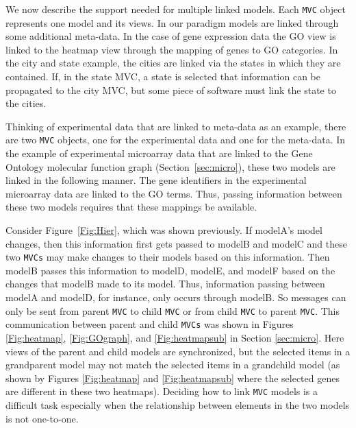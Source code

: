\documentclass[11pt]{article}
\newcommand{\Robject}[1]{{\texttt{#1}}}
\begin{document}

We now describe the support needed for multiple linked models.
Each \Robject{MVC} object represents one model and its views.  In our
paradigm models are linked through some additional meta-data. In
the case of gene expression data the GO view is linked to the heatmap
view through the mapping of genes to GO categories. In the city and
state example, the cities are linked via the states in which they are
contained. If, in the state MVC, a state is selected that information
can be propagated to the city MVC, but some piece of software must
link the state to the cities. %

Thinking of experimental data that are linked to meta-data as an
example, there are two \Robject{MVC} objects, one for the experimental
data and one for the meta-data.  In the example of experimental
microarray data that are linked to the Gene Ontology molecular
function graph (Section~\ref{sec:micro}), these two models are
linked in the following manner. The gene identifiers in the
experimental microarray data are linked to the GO terms.  Thus,
passing information between these two models requires that these
mappings be available.

Consider Figure~\ref{Fig:Hier}, which was shown previously.  If
modelA's model changes, then this information first gets passed to
modelB and modelC and these two \Robject{MVCs} may make changes to
their models based on this information.  Then modelB passes this
information to modelD, modelE, and modelF based on the changes
that modelB made to its model.  Thus, information passing between
modelA and modelD, for instance, only occurs through modelB.  So
messages can only be sent from parent \Robject{MVC} to child
\Robject{MVC} or from child \Robject{MVC} to parent \Robject{MVC}.
This communication between parent and child \Robject{MVCs} was shown in Figures
\ref{Fig:heatmap}, \ref{Fig:GOgraph}, and \ref{Fig:heatmapsub} in Section
\ref{sec:micro}.  Here views of the parent and child models are
synchronized, but the selected items in a grandparent model may not
match the selected items in a grandchild model (as shown by Figures
\ref{Fig:heatmap} and \ref{Fig:heatmapsub} where the selected genes are
different in these two heatmaps).  Deciding how to link \Robject{MVC} models 
is a difficult task especially when the relationship between elements in the 
two models is not one-to-one.
\end{document}
